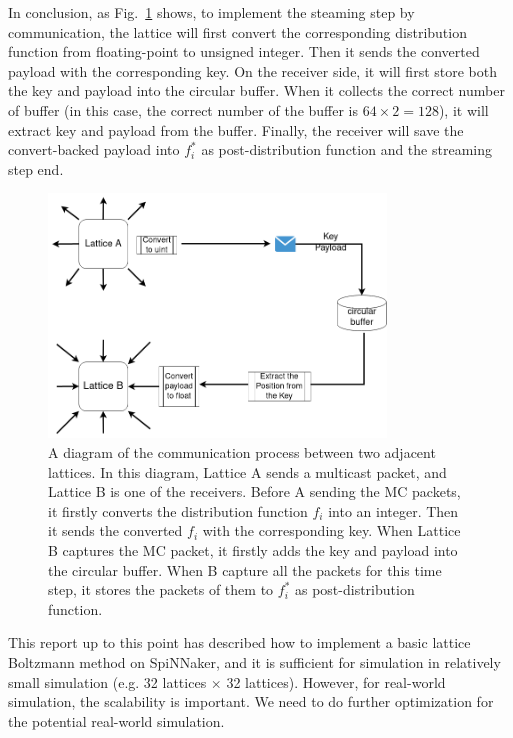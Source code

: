 In conclusion, as Fig.~\ref{fig:communicate} shows, to implement the steaming step by communication, the lattice will first convert the corresponding distribution function from floating-point to unsigned integer. Then it sends the converted payload with the corresponding key. On the receiver side, it will first store both the key and payload into the circular buffer. When it collects the correct number of buffer (in this case, the correct number of the buffer is $64\times2 = 128$), it will extract key and payload from the buffer. Finally, the receiver will save the convert-backed payload into $f_i^*$ as post-distribution function and the streaming step end.\\
\begin{figure}[!tb]
   \centering
       \includegraphics[width=0.8\textwidth]{figures/communication.png}
       \caption{A diagram of the communication process between two adjacent lattices. In this diagram, Lattice A sends a multicast packet, and Lattice B is one of the receivers. Before A sending the MC packets, it firstly converts the distribution function $f_i$ into an integer. Then it sends the converted $f_i$ with the corresponding key. When Lattice B captures the MC packet, it firstly adds the key and payload into the circular buffer. When B capture all the packets for this time step, it stores  the packets of them to $f_i^*$ as post-distribution function.}
       \label{fig:communicate}
\end{figure}

This report up to this point has described how to implement a basic lattice Boltzmann method on SpiNNaker, and it is sufficient for simulation in relatively small simulation (e.g. 32 lattices $\times$ 32 lattices). However, for real-world simulation, the scalability is important. We need to do further optimization for the potential real-world simulation.\\

